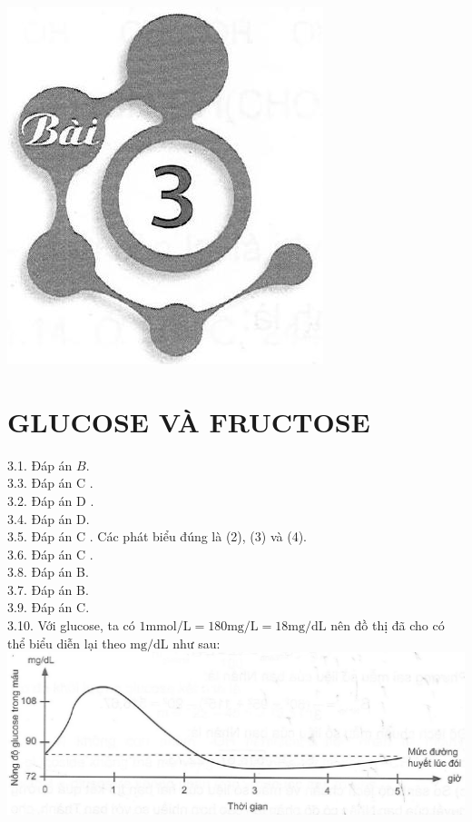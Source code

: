 \documentclass[10pt]{article}
\begin{document}
\begin{center}
\includegraphics[max width=\textwidth]{2025_10_23_b4e16b74380d0f7e7700g-024}
\end{center}

\section*{GLUCOSE VÀ FRUCTOSE}
3.1. Đáp án $B$.\\
3.3. Đáp án C .\\
3.2. Đáp án D .\\
3.4. Đáp án D.\\
3.5. Đáp án C . Các phát biểu đúng là (2), (3) và (4).\\
3.6. Đáp án C .\\
3.8. Đáp án B.\\
3.7. Đáp án B.\\
3.9. Đáp án C.\\
3.10. Với glucose, ta có $1 \mathrm{mmol} / \mathrm{L}=180 \mathrm{mg} / \mathrm{L}=18 \mathrm{mg} / \mathrm{dL}$ nên đồ thị đã cho có thể biểu diễn lại theo $\mathrm{mg} / \mathrm{dL}$ như sau:\\
\includegraphics[max width=\textwidth, center]{2025_10_23_b4e16b74380d0f7e7700g-024(1)}
\end{document}

